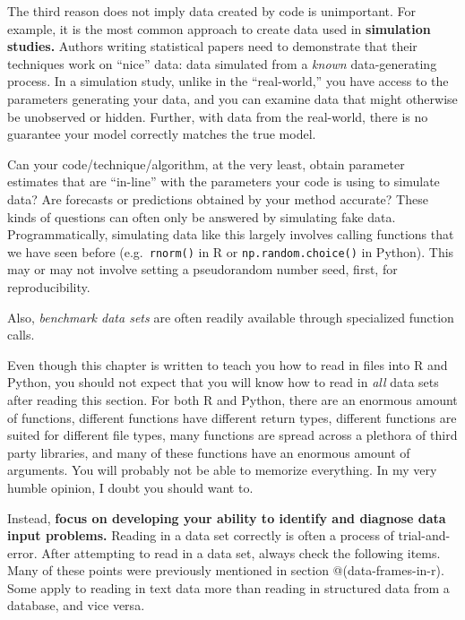 \documentclass[
  12pt,
  krantz2]{krantz}
\newenvironment{rmd-details}{\begin{lrbox}{\rmdbox}
  \minipage[c]{\dimexpr \textwidth-2\fboxrule-\wd\bulb-\columnsep}
    \vspace*{\columnsep}}%
{\vspace*{\columnsep}\endminipage\end{lrbox}%
  {\par\color{green}\fboxsep=0pt
    \fbox{\usebox\bulb\usebox\rmdbox\hspace{\columnsep}}\par}}
\begin{document}
\begin{rmd-details}
The third reason does not imply data created by code is unimportant. For example, it is the most common approach to create data used in \textbf{simulation studies.} Authors writing statistical papers need to demonstrate that their techniques work on ``nice'' data: data simulated from a \emph{known} data-generating process. In a simulation study, unlike in the ``real-world,'' you have access to the parameters generating your data, and you can examine data that might otherwise be unobserved or hidden. Further, with data from the real-world, there is no guarantee your model correctly matches the true model.

Can your code/technique/algorithm, at the very least, obtain parameter estimates that are ``in-line'' with the parameters your code is using to simulate data? Are forecasts or predictions obtained by your method accurate? These kinds of questions can often only be answered by simulating fake data. Programmatically, simulating data like this largely involves calling functions that we have seen before (e.g.~\texttt{rnorm()} in R or \texttt{np.random.choice()} in Python). This may or may not involve setting a pseudorandom number seed, first, for reproducibility.

Also, \emph{benchmark data sets} are often readily available through specialized function calls.

\end{rmd-details}

Even though this chapter is written to teach you how to read in files into R and Python, you should not expect that you will know how to read in \emph{all} data sets after reading this section. For both R and Python, there are an enormous amount of functions, different functions have different return types, different functions are suited for different file types, many functions are spread across a plethora of third party libraries, and many of these functions have an enormous amount of arguments. You will probably not be able to memorize everything. In my very humble opinion, I doubt you should want to.

Instead, \textbf{focus on developing your ability to identify and diagnose data input problems.} Reading in a data set correctly is often a process of trial-and-error. After attempting to read in a data set, always check the following items. Many of these points were previously mentioned in section @(data-frames-in-r). Some apply to reading in text data more than reading in structured data from a database, and vice versa.
\end{document}
